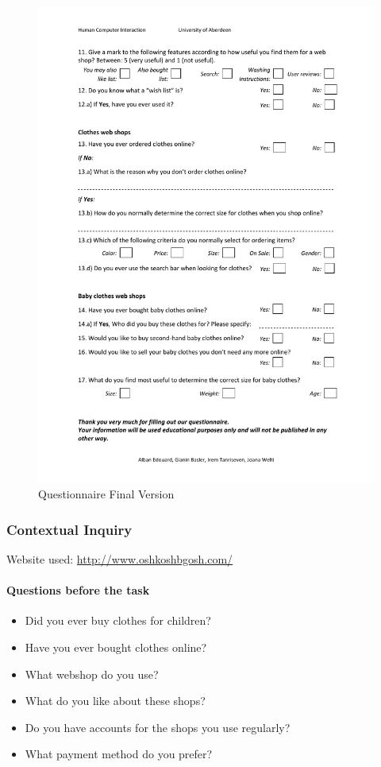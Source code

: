 \newpage
\begin{figure}[H]
\begin{center}
\includegraphics[scale=0.75]{User_Involvement_Methods/Questionnaires/Questionnaire_Web_Shops_v3_2.pdf}
\caption{Questionnaire Final Version}
\label{fig:final}
\end{center}
\end{figure}
\newpage

\subsubsection{Contextual Inquiry}\label{sec:contextual_inquiry}
Website used: \url{http://www.oshkoshbgosh.com/}

\paragraph{Questions before the task}
\begin{itemize}\addtolength{\itemsep}{-0.5\baselineskip}
 \item Did you ever buy clothes for children?
 \item Have you ever bought clothes online?
 \item What webshop do you use?
 \item What do you like about these shops?
 \item Do you have accounts for the shops you use regularly?
 \item What payment method do you prefer?
\end{itemize}


